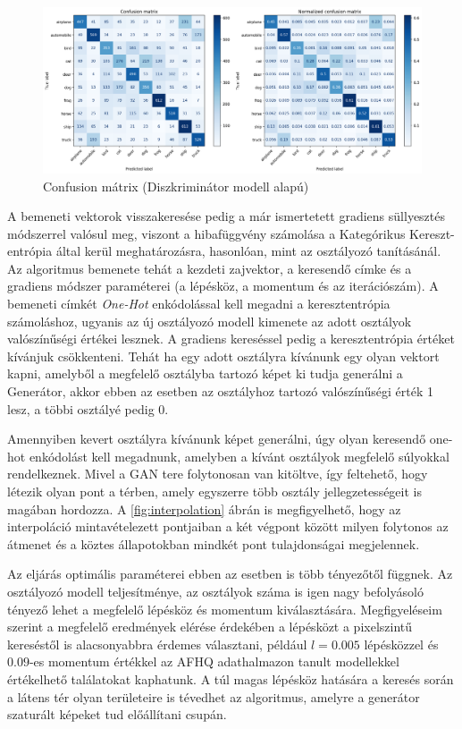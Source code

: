 \begin{figure}[h!]
	\centering
	\includegraphics[width=15cm]{images/transfer_discriminator_confusion.png}
	\caption{Confusion mátrix (Diszkriminátor modell alapú)}
	\label{fig:transfer_confusion_disc}
\end{figure}


A bemeneti vektorok visszakeresése pedig a már ismertetett gradiens süllyesztés módszerrel valósul meg, viszont a hibafüggvény számolása a Kategórikus Kereszt-entrópia által kerül meghatározásra, hasonlóan, mint az osztályozó tanításánál. Az algoritmus bemenete tehát a kezdeti zajvektor, a keresendő címke és a gradiens módszer paraméterei (a lépésköz, a momentum és az iterációszám).
A bemeneti címkét \textit{One-Hot} enkódolással kell megadni a keresztentrópia számoláshoz, ugyanis az új osztályozó modell kimenete az adott osztályok valószínűségi értékei lesznek. A gradiens kereséssel pedig a keresztentrópia értéket kívánjuk csökkenteni. Tehát ha egy adott osztályra kívánunk egy olyan vektort kapni, amelyből a megfelelő osztályba tartozó képet ki tudja generálni a Generátor, akkor ebben az esetben az osztályhoz tartozó valószínűségi érték 1 lesz, a többi osztályé pedig 0.

Amennyiben kevert osztályra kívánunk képet generálni, úgy olyan keresendő one-hot enkódolást kell megadnunk, amelyben a kívánt osztályok megfelelő súlyokkal rendelkeznek. Mivel a GAN tere folytonosan van kitöltve, így feltehető, hogy létezik olyan pont a térben, amely egyszerre több osztály jellegzetességeit is magában hordozza. A \ref{fig:interpolation} ábrán is megfigyelhető, hogy az interpoláció mintavételezett pontjaiban a két végpont között milyen folytonos az átmenet és a köztes állapotokban mindkét pont tulajdonságai megjelennek.

Az eljárás optimális paraméterei ebben az esetben is több tényezőtől függnek. Az osztályozó modell teljesítménye, az osztályok száma is igen nagy befolyásoló tényező lehet a megfelelő lépésköz és momentum kiválasztására.  Megfigyeléseim szerint a megfelelő eredmények elérése érdekében a lépésközt a pixelszintű kereséstől is alacsonyabbra érdemes választani, például $l=0.005$ lépésközzel és $0.09$-es momentum értékkel az AFHQ adathalmazon tanult modellekkel értékelhető találatokat kaphatunk. A túl magas lépésköz hatására a keresés során a látens tér olyan területeire is tévedhet az algoritmus, amelyre a generátor szaturált képeket tud előállítani csupán.


